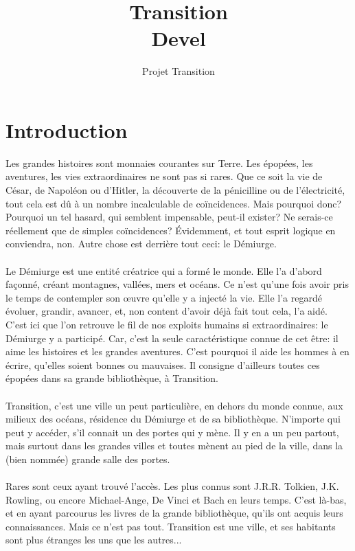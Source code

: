 \documentclass{book}
\title{Transition \\ Devel}
\author{Projet Transition}
\date{\oldstylenums{\insertdate}}
\begin{document}
\maketitle
\setcounter{tocdepth}{2} %
\renewcommand{\contentsname}{Sommaire} 
\tableofcontents

\newpage
\section*{Introduction}
Les grandes histoires sont monnaies courantes sur Terre. Les épopées, les aventures, les vies extraordinaires ne sont pas si rares. Que ce soit la  vie de César, de Napoléon ou d'Hitler, la découverte de la pénicilline ou de l’électricité, tout cela est dû à un nombre incalculable de coïncidences. Mais pourquoi donc? Pourquoi un tel hasard, qui semblent impensable, peut-il exister? Ne serais-ce réellement que de simples coïncidences?
Évidemment, et tout esprit logique en conviendra, non. Autre chose est derrière tout ceci: le Démiurge.
\\
\\
Le Démiurge est une entité créatrice qui a formé le monde. Elle l'a d'abord façonné, créant montagnes, vallées, mers et océans. Ce n'est qu'une fois avoir pris le temps de contempler son œuvre qu'elle y a injecté la vie. Elle l'a regardé évoluer, grandir, avancer, et, non content d'avoir déjà fait tout cela, l'a aidé.
\\
C'est ici que l'on retrouve le fil de nos exploits humains si extraordinaires: le Démiurge y a participé. Car, c'est la seule caractéristique connue de cet être: il aime les histoires et les grandes aventures. C'est pourquoi il aide les hommes à en écrire, qu'elles soient bonnes ou mauvaises.
Il consigne d'ailleurs toutes ces épopées dans sa grande bibliothèque, à Transition.
\\
\\
Transition, c'est une ville un peut particulière, en dehors du monde connue, aux milieux des océans, résidence du Démiurge et de sa bibliothèque. N'importe qui peut y accéder, s'il connait un des portes qui y mène. Il y en a un peu partout, mais surtout dans les grandes villes et toutes mènent au pied de la ville, dans la (bien nommée) grande salle des portes.
\\
\\
Rares sont ceux ayant trouvé l'accès. Les plus connus sont J.R.R. Tolkien, J.K. Rowling, ou encore Michael-Ange, De Vinci et Bach en leurs temps. C'est là-bas, et en ayant parcourus les livres de la grande bibliothèque, qu'ils ont acquis leurs connaissances. Mais ce n'est pas tout. Transition est une ville, et ses habitants sont plus étranges les uns que les autres...
\end{document}
